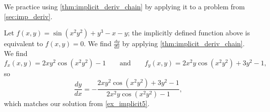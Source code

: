 We practice using \autoref{thm:implicit_deriv_chain} by applying it to a problem from \autoref{sec:imp_deriv}.

{Let $f(x,y) = \sin(x^2y^2)+y^3-x-y$; the implicitly defined function above is equivalent to $f(x,y)=0$. We find $\frac{dy}{dx}$ by applying \autoref{thm:implicit_deriv_chain}. We find 
$$f_x(x,y) = 2xy^2\cos(x^2y^2)-1\qquad \text{and}\qquad f_y(x,y) = 2x^2y\cos(x^2y^2)+3y^2-1,$$
so 
$$\frac{dy}{dx} = -\frac{2xy^2\cos(x^2y^2)+3y^2-1}{2x^2y\cos(x^2y^2)-1},$$
which matches our solution from \autoref{ex_implicit5}.}


